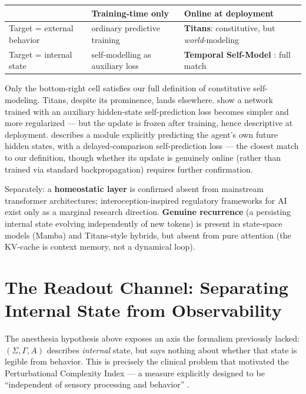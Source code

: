 \documentclass[11pt]{article}
\begin{document}
\begin{center}
\small
\begin{tabular}{@{}>{\raggedright}p{2.6cm}>{\raggedright}p{4.5cm}>{\raggedright\arraybackslash}p{4.5cm}@{}}
\toprule
 & \textbf{Training-time only} & \textbf{Online at deployment} \\
\midrule
Target = external behavior & ordinary predictive training & \textbf{Titans}: constitutive, but \emph{world}-modeling \\[4pt]
Target = internal state & self-modelling as auxiliary loss \cite{premakumar2026} & \textbf{Temporal Self-Model} \cite{tsm2026}: full match \\
\bottomrule
\end{tabular}
\end{center}
Only the bottom-right cell satisfies our full definition of constitutive self-modeling. Titans, despite its prominence, lands elsewhere. \cite{premakumar2026} show a network trained with an auxiliary hidden-state self-prediction loss becomes simpler and more regularized --- but the update is frozen after training, hence descriptive at deployment. \cite{tsm2026} describes a module explicitly predicting the agent's own future hidden states, with a delayed-comparison self-prediction loss --- the closest match to our definition, though whether its update is genuinely online (rather than trained via standard backpropagation) requires further confirmation.

Separately: a \textbf{homeostatic layer} is confirmed absent from mainstream transformer architectures; interoception-inspired regulatory frameworks for AI \cite{interoceptive2026} exist only as a marginal research direction. \textbf{Genuine recurrence} (a persisting internal state evolving independently of new tokens) is present in state-space models (Mamba) and Titans-style hybrids, but absent from pure attention (the KV-cache is context memory, not a dynamical loop).

\section{The Readout Channel: Separating Internal State from Observability}\label{sec:readout}

The anesthesia hypothesis above exposes an axis the formalism previously lacked: $(\Sigma,\Gamma,A)$ describes \emph{internal} state, but says nothing about whether that state is legible from behavior. This is precisely the clinical problem that motivated the Perturbational Complexity Index --- a measure explicitly designed to be ``independent of sensory processing and behavior'' \cite{casali2013}.
\end{document}
